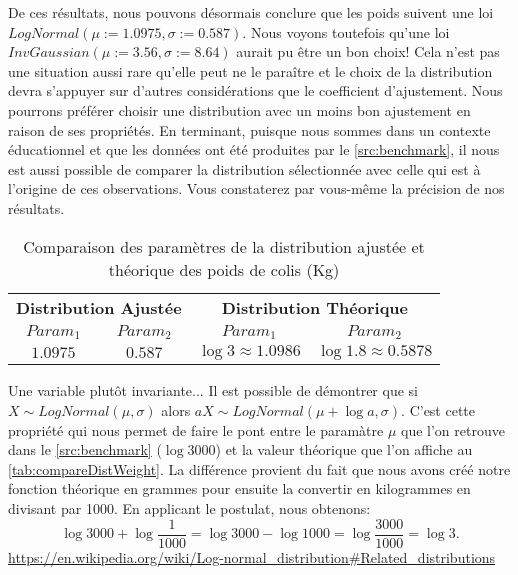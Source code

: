 De ces résultats, nous pouvons désormais conclure que les poids suivent une loi $LogNormal(\mu := 1.0975,\sigma := 0.587)$. Nous voyons toutefois qu'une loi $InvGaussian(\mu := 3.56,\sigma := 8.64)$ aurait pu être un bon choix! Cela n'est pas une situation aussi rare qu'elle peut ne le paraître et le choix de la distribution devra s'appuyer sur d'autres considérations que le coefficient d'ajustement. Nous pourrons préférer choisir une distribution avec un moins bon ajustement en raison de ses propriétés. En terminant, puisque nous sommes dans un contexte éducationnel et que les données ont été produites par le \autoref{src:benchmark}, il nous est aussi possible de comparer la distribution sélectionnée avec celle qui est à l'origine de ces observations. Vous constaterez par vous-même la précision de nos résultats. \\

\begin{table}
	\centering
	\begin{tabular}{cccc}
		\multicolumn{2}{c}{\textbf{Distribution Ajustée}} & \multicolumn{2}{c}{\textbf{Distribution Théorique}} \\
		\textbf{$Param_1$} & \textbf{$Param_2$} & \textbf{$Param_1$} & \textbf{$Param_2$} \\
		\hline
		$1.0975$ & $0.587$ & $\log{3} \approx 1.0986$ & $\log{1.8} \approx 0.5878$
	\end{tabular}
	\caption{Comparaison des paramètres de la distribution ajustée et théorique des poids de colis (Kg)}
	\label{tab:compareDistWeight}
\end{table}

\begin{moreInfo}{Une variable plutôt invariante...}
	Il est possible de démontrer que si $X \sim LogNormal(\mu,\sigma)$ alors $aX \sim LogNormal(\mu + \log{a},\sigma)$. C'est cette propriété qui nous permet de faire le pont entre le paramàtre $\mu$ que l'on retrouve dans le \autoref{src:benchmark} ($\log{3000}$) et la valeur théorique que l'on affiche au \autoref{tab:compareDistWeight}. La différence provient du fait que nous avons créé notre fonction théorique en grammes pour ensuite la convertir en kilogrammes en divisant par 1000. En applicant le postulat, nous obtenons:
	$$\log{3000}+\log{\frac{1}{1000}} = \log{3000}-\log{1000} = \log{\frac{3000}{1000}} = \log{3}.$$
	\url{https://en.wikipedia.org/wiki/Log-normal_distribution#Related_distributions}
\end{moreInfo}
